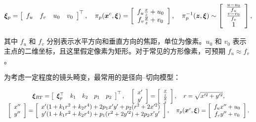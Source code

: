 \begin{equation*}
\boldsymbol {\xi} _ {p} = \left[ \begin{array}{c c c c} f _ {u} & f _ {v} & u _ {0} & v _ {0} \end{array} \right] ^ {\top}, \quad \pi_ {p} (\boldsymbol {x} ^ {c}, \boldsymbol {\xi}) = \left[ \begin{array}{c} f _ {u} \frac {x}{z} + u _ {0} \\ f _ {v} \frac {y}{z} + v _ {0} \end{array} \right], \quad \pi_ {p} ^ {- 1} (\boldsymbol {z}, \boldsymbol {\xi}) \sim \left[ \begin{array}{c} \frac {u - u _ {0}}{f _ {u}} \\ \frac {v - v _ {0}}{f _ {v}} \\ 1 \end{array} \right],
\end{equation*}

其中 $f _ { u }$ 和 $f _ { v }$ 分别表示水平方向和垂直方向的焦距，单位为像素。$u _ { 0 }$ 和 $v _ { 0 }$ 表示主点的二维坐标，且这里假定像素为矩形。对于常见的方形像素，可预期 $f _ { u } \approx f _ { v }$。

为考虑一定程度的镜头畸变，最常用的是径向--切向模型：

\begin{equation*}
\begin{array}{c}
\boldsymbol {\xi} _ {R T} = \left[ \begin{array}{c c c c c} \boldsymbol {\xi} _ {p} ^ {\top} & k _ {1} & k _ {2} & p _ {1} & p _ {2} \end{array} \right] ^ {\top}, \quad
\left[ \begin{array}{c} x ^ {\prime} \\ y ^ {\prime} \end{array} \right] = \left[ \begin{array}{c} \frac {x}{z} \\ \frac {y}{z} \end{array} \right], \quad r = \sqrt {x ^ {\prime 2} + y ^ {\prime 2}}, \\
\left[ \begin{array}{c} x ^ {\prime \prime} \\ y ^ {\prime \prime} \end{array} \right] = \left[ \begin{array}{c}
x ^ {\prime} (1 + k _ {1} r ^ {2} + k _ {2} r ^ {4}) + 2 p _ {1} x ^ {\prime} y ^ {\prime} + p _ {2} (r ^ {2} + 2 x ^ {\prime 2}) \\
y ^ {\prime} (1 + k _ {1} r ^ {2} + k _ {2} r ^ {4}) + p _ {1} (r ^ {2} + 2 y ^ {\prime 2}) + 2 p _ {2} x ^ {\prime} y ^ {\prime}
\end{array} \right], \quad
\pi_ {p} (\boldsymbol {x} ^ {c}, \boldsymbol {\xi}) = \left[ \begin{array}{c} f _ {u} x ^ {\prime \prime} + u _ {0} \\ f _ {v} y ^ {\prime \prime} + v _ {0} \end{array} \right].
\end{array}
\end{equation*}

